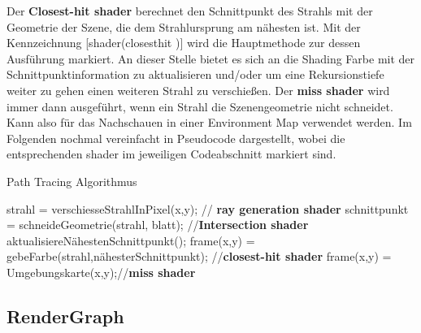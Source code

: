 Der \textbf{Closest-hit shader} berechnet den Schnittpunkt des Strahls mit der Geometrie
der Szene, die dem Strahlursprung am nähesten ist.
Mit der Kennzeichnung [shader(\dq closesthit \dq)] wird die Hauptmethode zur 
dessen Ausführung markiert. An dieser Stelle bietet es sich an die Shading Farbe 
mit der Schnittpunktinformation zu aktualisieren und/oder um eine Rekursionstiefe weiter 
zu gehen einen weiteren Strahl zu verschießen. 
Der \textbf{miss shader} wird immer dann ausgeführt, wenn ein Strahl die
Szenengeometrie nicht schneidet. Kann also für das Nachschauen in einer 
Environment Map verwendet werden. Im Folgenden 
nochmal vereinfacht in Pseudocode dargestellt, wobei die entsprechenden shader
im jeweiligen Codeabschnitt markiert sind.

\begin{algorithm}[H]
    \caption{Path Tracing Algorithmus}
    \begin{algorithmic}[1]
        \State strahl = verschiesseStrahlInPixel(x,y); // \textbf{ray generation shader}
        \State schnittpunkt = schneideGeometrie(strahl, blatt); //\textbf{Intersection shader}
        \State aktualisiereNähestenSchnittpunkt();
        \EndIf
        \EndFor
        \State frame(x,y) = gebeFarbe(strahl,nähesterSchnittpunkt); //\textbf{closest-hit shader}
        \Else
        \State frame(x,y) = Umgebungskarte(x,y);//\textbf{miss shader}
        \EndIf
        \EndFor
        \EndProcedure
    \end{algorithmic}
    \label{alg:Path Tracer Konzept}
\end{algorithm}

\subsection{RenderGraph}




